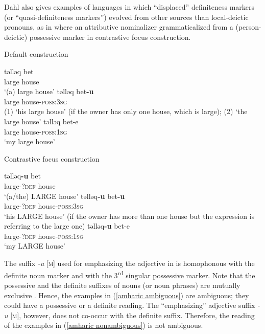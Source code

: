 {Dahl also gives examples of languages in which “displaced” definiteness markers (or “quasi-definiteness markers”) evolved from other sources than local-deictic pronouns, as in  where an attributive nominalizer grammaticalized from a (person-deictic) possessive marker in contrastive focus construction.
\begin{exe}
\ex	{}
\begin{xlist}
\ex	\rm{Default construction}
\begin{xlist}
\ex
\gll	təlləq bet\\
	large	house\\								
\glt	‘(a) large house’
\ex	\label{amharic ambiguous}
\gll	təlləq bet\textbf{-u}\\
	large house-\textsc{poss:3sg}\\
\glt	(1) ‘his large house’ (if the owner has only one house, which is large); (2) ‘the large house’
\ex
\gll	təlləq bet-e\\
	large house-\textsc{poss:1sg}\\
\glt	‘my large house’
\end{xlist}
\ex	\rm{Contrastive focus construction}
\begin{xlist}
\ex	
\gll	təlləq\textbf{-u} bet\\
	large-\textsc{?def} house\\
\glt	‘(a/the) LARGE house’
\ex	\label{amharic nonambiguous}
\gll	təlləq\textbf{-u} bet\textbf{-u}\\
	large-\textsc{?def} house-\textsc{poss:3sg}\\
\glt	‘his LARGE house’ (if the owner has more than one house but the expression is referring to the large one)
\ex
\gll	təlləq\textbf{-u} bet-e\\
	large-\textsc{?def} house-\textsc{poss:1sg}\\
\glt	‘my LARGE house’
\end{xlist}
\end{xlist}
\end{exe}
The suffix \textit{-u} [\textsc{m}] used for emphasizing the adjective in  is homophonous with the definite noun marker and with the 3\textsuperscript{rd} singular possessive marker. Note that the possessive and the definite suffixes of nouns (or noun phrases) are mutually exclusive \citep[463]{hudson1997}. Hence, the examples in (\ref{amharic ambiguous}) are ambiguous; they could have a possessive or a definite reading. The “emphasizing” adjective suffix \textit{-u} [\textsc{m}], however, does not co-occur with the definite suffix. Therefore, the reading of the examples in (\ref{amharic nonambiguous}) is not ambiguous.

}

